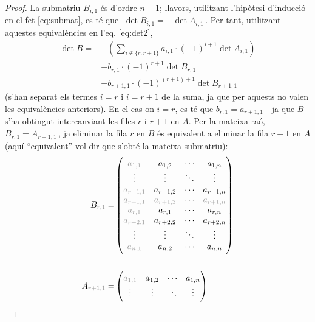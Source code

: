 \begin{lema}
\begin{proof}
		La submatriu $B_{i,1}$ és d'ordre $n-1$; llavors, utilitzant l'hipòtesi d'inducció en el fet \eqref{eq:submat}, es té que $\;\det B_{i,1} = - \det A_{i,1}\,$. Per tant, utilitzant aquestes equivalències en l'eq. \eqref{eq:det2},
		\begin{equation}\label{eq:dev1}
		\begin{split}
		\det B =& 	-\left(\sum_{i\notin \{r, r+1\}} a_{i,1}\cdot(-1)^{i+1}\det A_{i,1}\right)\\
		&	+ b_{r,1}\cdot(-1)^{r+1}\det B_{r,1}\\
		&	+ b_{r+1,1}\cdot(-1)^{(r+1)+1}\det B_{r+1,1}\,
		\end{split}
		\end{equation}
		(s'han separat els termes $i=r$ i $i=r+1$ de la suma, ja que per aquests no valen les equivalències anteriors).
		En el cas on $i = r$, es té que $b_{r,1} = a_{r+1,1}$---ja que $B$ s'ha obtingut intercanviant les files $r$ i $r+1$ en $A$. Per la mateixa raó, $B_{r,1} = A_{r+1, 1}\,$, ja eliminar la fila $r$ en $B$ és equivalent a eliminar la fila $r+1$ en $A$ (aquí ``equivalent'' vol dir que s'obté la mateixa submatriu):
		\begin{alignat*}{2}
		B_{\color[gray]{0.6}r,1} = &
		\begin{pmatrix}
		\color[gray]{0.6}
		a_{1,1} &	a_{1,2} &	\cdots &	a_{1,n} \\
		\color[gray]{0.6}
		\vdots &	\vdots &	\ddots &	\vdots \\
		\color[gray]{0.6}
		a_{r-1,1} &	a_{r-1,2} &	\cdots &	a_{r-1,n} \\
		\color[gray]{0.6}
		a_{r+1,1} &	\color[gray]{0.6}a_{r+1,2} &\color[gray]{0.6}	\cdots &	\color[gray]{0.6}a_{r+1,n}  \\
		\color[gray]{0.6}
		a_{r,1} &	a_{r,1} &	\cdots &	a_{r,n} \\
		\color[gray]{0.6}
		a_{r+2,1} &	a_{r+2,2} &	\cdots &	a_{r+2,n} \\
		\color[gray]{0.6}
		\vdots &	\vdots &	\ddots &	\vdots \\
		\color[gray]{0.6}
		a_{n,1} &	a_{n,2} &	\cdots &	a_{n,n} \\
		\end{pmatrix}
		\\ \\
		A_{\color[gray]{0.6}r+1,1} = &
		\begin{pmatrix}
		\color[gray]{0.6}
		a_{1,1} &	a_{1,2} &	\cdots &	a_{1,n} \\
		\color[gray]{0.6}
		\vdots &	\vdots &	\ddots &	\vdots \\

\end{pmatrix}
\end{alignat*}
\end{proof}
\end{lema}
